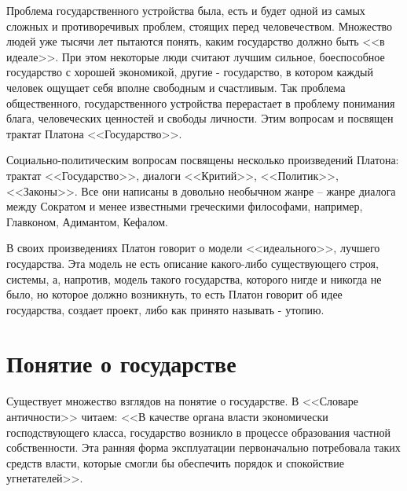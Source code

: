 	Проблема государственного устройства была, есть и будет одной из самых сложных 
	и противоречивых проблем, стоящих перед человечеством. Множество людей уже 
	тысячи лет пытаются понять, каким государство должно быть <<в идеале>>. При этом 
	некоторые люди считают лучшим сильное, боеспособное государство с хорошей 
	экономикой, другие - государство, в котором каждый человек ощущает себя вполне 
	свободным и счастливым. Так проблема общественного, государственного устройства 
	перерастает в проблему понимания блага, человеческих ценностей и свободы 
	личности. Этим вопросам и посвящен трактат Платона <<Государство>>.

	Социально-политическим вопросам посвящены несколько произведений Платона: 
	трактат <<Государство>>, диалоги <<Критий>>, <<Политик>>, <<Законы>>. Все они 
	написаны в довольно необычном жанре -- жанре диалога между Сократом и менее 
	известными греческими философами, например, Главконом, Адимантом, Кефалом. 

	В своих произведениях Платон говорит о модели <<идеального>>, лучшего 
	государства. Эта модель не есть описание какого-либо существующего строя, 
	системы, а, напротив, модель такого государства, которого нигде и никогда 
	не было, но которое должно возникнуть, то есть Платон говорит об идее 
	государства, создает проект, либо как принято называть - утопию.

\pagebreak
\chapter{Понятие о государстве}

	Существует множество взглядов на понятие о государстве. В <<Словаре 
	античности>> читаем: <<В качестве органа власти экономически 
	господствующего класса, государство возникло в процессе образования 
	частной собственности. Эта ранняя форма эксплуатации первоначально 
	потребовала таких средств власти, которые смогли бы обеспечить порядок 
	и спокойствие угнетателей>>. 

